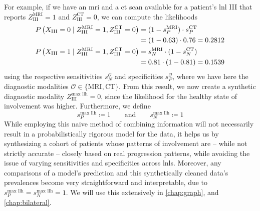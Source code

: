 \documentclass[\relativeRoot/main.tex]{subfiles}
\begin{document}
For example, if we have an \gls{mri} and a \gls{ct} scan available for a patient's \gls{lnl} III that reports $Z_\text{III}^\text{MRI} = 1$ and $Z_\text{III}^\text{CT} = 0$, we can compute the likelihoods
%
\begin{equation}
    \begin{aligned}
        P \left( X_\text{III} = 0 \mid Z_\text{III}^\text{MRI} = 1, Z_\text{III}^\text{CT} = 0 \right)
        &= (1 - s^\text{MRI}_P) \cdot s^\text{CT}_P \\
        &= (1 - 0.63) \cdot 0.76 = 0.2812 \\
        P \left( X_\text{III} = 1 \mid Z_\text{III}^\text{MRI} = 1, Z_\text{III}^\text{CT} = 0 \right)
        &= s^\text{MRI}_N \cdot (1 - s^\text{CT}_N) \\
        &= 0.81 \cdot (1 - 0.81) = 0.1539
    \end{aligned}
\end{equation}
%
using the respective sensitivities $s_N^\mathcal{O}$ and specificities $s_P^\mathcal{O}$, where we have here the diagnostic modalities $\mathcal{O} \in \{ \text{MRI}, \text{CT} \}$. From this result, we now create a synthetic diagnostic modality $Z_\text{III}^\text{max llh} = 0$, since the likelihood for the healthy state of involvement was higher. Furthermore, we define
%
\begin{equation}
    s_P^\text{max llh} \coloneqq 1 \qquad \text{and} \qquad s_N^\text{max llh} \coloneqq 1
\end{equation}
%
While employing this naive method of combining information will not necessarily result in a probabilistically rigorous model for the data, it helps us by synthesizing a cohort of patients whose patterns of involvement are -- while not strictly accurate -- closely based on real progression patterns, while avoiding the issue of varying sensitivities and specificities across \glspl{lnl}. Moreover, any comparisons of a model's prediction and this synthetically cleaned data's prevalences become very straightforward and interpretable, due to $s_P^\text{max llh} = s_N^\text{max llh} = 1$. We will use this extensively in \cref{chap:graph}, and \cref{chap:bilateral}.
\end{document}
